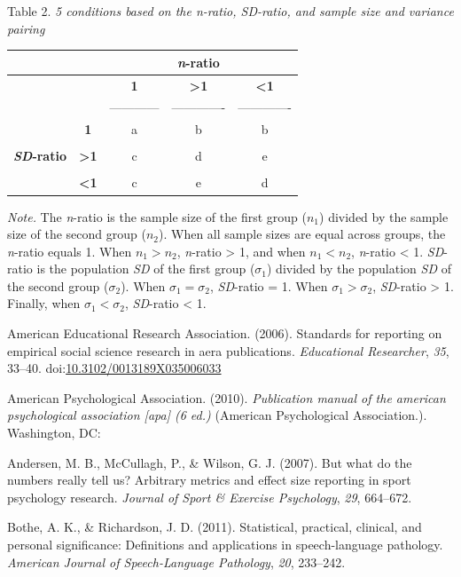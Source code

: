 \documentclass[man]{apa6}
\begin{document}
Table 2.
\emph{5 conditions based on the n-ratio, SD-ratio, and sample size and variance pairing}

\begin{longtable}[]{@{}ccccc@{}}
\toprule
& & & \textbf{\emph{n}-ratio} &\tabularnewline
\midrule
\endhead
& & \textbf{1} & \textbf{\textgreater1} & \textbf{\textless1}\tabularnewline
& & ------------ & ------------- & -------------\tabularnewline
& \textbf{1} & a & b & b\tabularnewline
& & & &\tabularnewline
\textbf{\emph{SD}-ratio} & \textbf{\textgreater1} & c & d & e\tabularnewline
& & & &\tabularnewline
& \textbf{\textless1} & c & e & d\tabularnewline
\bottomrule
\end{longtable}

\emph{Note.} The \emph{n}-ratio is the sample size of the first group (\(n_1\)) divided by the sample size of the second group (\(n_2\)). When all sample sizes are equal across groups, the \emph{n}-ratio equals 1. When \(n_1 > n_2\), \emph{n}-ratio \textgreater{} 1, and when \(n_1 < n_2\), \emph{n}-ratio \textless{} 1. \emph{SD}-ratio is the population \emph{SD} of the first group (\(\sigma_1\)) divided by the population \emph{SD} of the second group (\(\sigma_2\)). When \(\sigma_1=\sigma_2\), \emph{SD}-ratio = 1. When \(\sigma_1>\sigma_2\), \emph{SD}-ratio \textgreater{} 1. Finally, when \(\sigma_1<\sigma_2\), \emph{SD}-ratio \textless{} 1.

\hypertarget{refs}{}
\leavevmode\hypertarget{ref-AERA_2006}{}%
American Educational Research Association. (2006). Standards for reporting on empirical social science research in aera publications. \emph{Educational Researcher}, \emph{35}, 33--40. doi:\href{https://doi.org/10.3102/0013189X035006033}{10.3102/0013189X035006033}

\leavevmode\hypertarget{ref-APA_2010}{}%
American Psychological Association. (2010). \emph{Publication manual of the american psychological association {[}apa{]} (6 ed.)} (American Psychological Association.). Washington, DC:

\leavevmode\hypertarget{ref-Andersen_et_al_2007}{}%
Andersen, M. B., McCullagh, P., \& Wilson, G. J. (2007). But what do the numbers really tell us? Arbitrary metrics and effect size reporting in sport psychology research. \emph{Journal of Sport \& Exercise Psychology}, \emph{29}, 664--672.

\leavevmode\hypertarget{ref-Bothe_Richardson_2011}{}%
Bothe, A. K., \& Richardson, J. D. (2011). Statistical, practical, clinical, and personal significance: Definitions and applications in speech-language pathology. \emph{American Journal of Speech-Language Pathology}, \emph{20}, 233--242.
\end{document}
